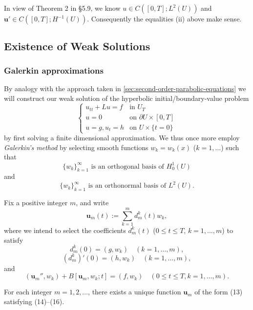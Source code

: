 \begin{remark}
\label{rem:weak-solution-hyperbolic-continuity}
In view of Theorem 2 in \S5.9, we know $u \in C([0,T];L^2(U))$ and $\mathbf{u}' \in C([0,T];H^{-1}(U))$. Consequently the equalities (ii) above make sense.
\end{remark}

\subsection{Existence of Weak Solutions}

\subsubsection{Galerkin approximations}

By analogy with the approach taken in \cref{sec:second-order-parabolic-equations} we will construct our weak solution of the hyperbolic initial/boundary-value problem
\[
\begin{cases} u_{tt} + Lu = f & \text{in } U_T \\ u = 0 & \text{on } \partial U \times [0,T] \\ u = g, u_t = h & \text{on } U \times \{t = 0\} \end{cases}
\tag{10}
\]
by first solving a finite dimensional approximation. We thus once more employ \textit{Galerkin's method} by selecting smooth functions $w_k = w_k(x)$ ($k = 1, \ldots$) such that
\[
\{w_k\}_{k=1}^{\infty} \text{ is an orthogonal basis of } H_0^1(U)
\tag{11}
\]
and
\[
\{w_k\}_{k=1}^{\infty} \text{ is an orthonormal basis of } L^2(U).
\tag{12}
\]

Fix a positive integer $m$, and write
\[
\mathbf{u}_m(t) := \sum_{k=1}^{m} d_m^k(t)w_k,
\tag{13}
\]
where we intend to select the coefficients $d_m^k(t)$ ($0 \le t \le T$, $k = 1, \ldots, m$) to satisfy
\[
d_m^k(0) = (g,w_k) \quad (k = 1, \ldots, m),
\tag{14}
\]
\[
(d_m^k)'(0) = (h,w_k) \quad (k = 1, \ldots, m),
\tag{15}
\]
and
\[
(\mathbf{u}_m'', w_k) + B[\mathbf{u}_m, w_k; t] = (f, w_k) \quad (0 \le t \le T, k = 1, \ldots, m).
\tag{16}
\]

\begin{theorem}
\label{thm:hyperbolic-galerkin-approximate-solutions}
For each integer $m = 1, 2, \ldots$, there exists a unique function $\mathbf{u}_m$ of the form (13) satisfying (14)--(16).
\end{theorem}

